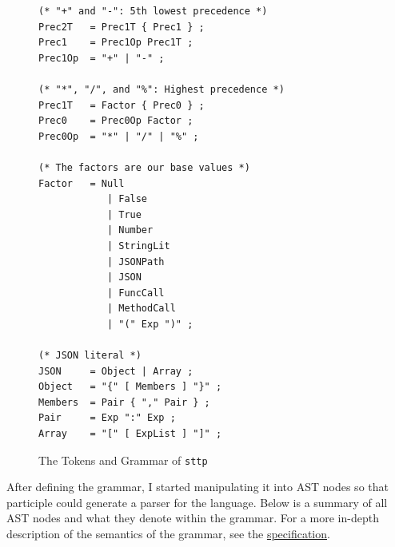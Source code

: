 \documentclass[]{full}
\theoremstyle{definition}
\begin{document}
\begin{figure}[H]\ContinuedFloat
    \begin{verbatim}
(* "+" and "-": 5th lowest precedence *)
Prec2T   = Prec1T { Prec1 } ;
Prec1    = Prec1Op Prec1T ;
Prec1Op  = "+" | "-" ;

(* "*", "/", and "%": Highest precedence *)
Prec1T   = Factor { Prec0 } ;
Prec0    = Prec0Op Factor ;
Prec0Op  = "*" | "/" | "%" ;

(* The factors are our base values *)
Factor   = Null
            | False
            | True
            | Number
            | StringLit
            | JSONPath
            | JSON
            | FuncCall
            | MethodCall
            | "(" Exp ")" ;

(* JSON literal *)
JSON     = Object | Array ;
Object   = "{" [ Members ] "}" ;
Members  = Pair { "," Pair } ;
Pair     = Exp ":" Exp ;
Array    = "[" [ ExpList ] "]" ;
    \end{verbatim}
    \cprotect\caption{The Tokens and Grammar of \verb|sttp|}
\end{figure}

After defining the grammar, I started manipulating it into AST nodes so that participle could generate a parser for the language. Below is a summary of all AST nodes and what they denote within the grammar. For a more in-depth description of the semantics of the grammar, see the \hyperref[appendix:sttp-specification]{specification}.
\end{document}
